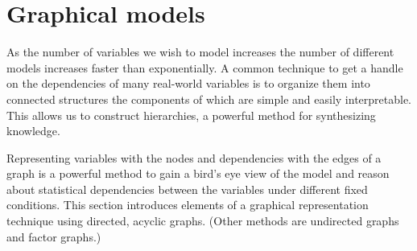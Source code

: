 \newpage
\section{Graphical models}
As the number of variables we wish to model increases the number of different models increases faster than exponentially. A common technique to get a handle on the dependencies of many real-world variables is to organize them into connected structures the components of which are simple and easily interpretable. This allows us to construct hierarchies, a powerful method for synthesizing knowledge.

Representing variables with the nodes and dependencies with the edges of a graph is a powerful method to gain a bird's eye view of the model and reason about statistical dependencies between the variables under different fixed conditions. This section introduces elements of a graphical representation technique using directed, acyclic graphs. (Other methods are undirected graphs and factor graphs.)

